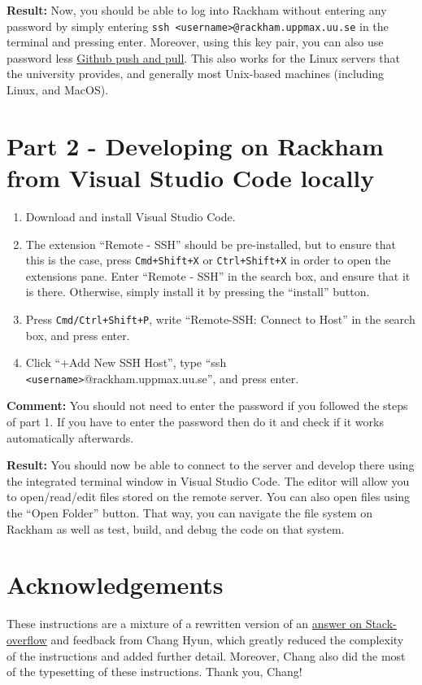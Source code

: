 \documentclass[10pt]{article}
\begin{document}
\textbf{Result:} Now, you should be able to log into Rackham without entering any password by simply entering
\texttt{ssh <username>@rackham.uppmax.uu.se} in the terminal and pressing enter. Moreover, using this key pair,
you can also use password less \href{https://docs.github.com/en/authentication/connecting-to-github-with-ssh/adding-a-new-ssh-key-to-your-github-account}
{Github push and pull}.
This also works for the Linux servers that the university provides, and generally most Unix-based
machines (including Linux, and MacOS).

\section{Part 2 - Developing on Rackham from Visual Studio Code locally}
\begin{enumerate}
\item Download and install Visual Studio Code.
\item The extension “Remote - SSH” should be pre-installed, but to ensure that this is the case, press
\texttt{Cmd+Shift+X} or \texttt{Ctrl+Shift+X} in order to open the extensions pane. Enter “Remote - SSH” in the search box, and
ensure that it is there. Otherwise, simply install it by pressing the “install” button.
\item Press \texttt{Cmd/Ctrl+Shift+P}, write “Remote-SSH: Connect to Host” in the search box, and press enter.
\item Click “+Add New SSH Host”, type “ssh \texttt{<username>}@rackham.uppmax.uu.se”, and press enter.
\end{enumerate}

\textbf{Comment:} You should not need to enter the password if you followed the steps of part 1. If you have
to enter the password then do it and check if it works automatically afterwards.

\textbf{Result:} You should now be able to connect to the server and develop there using the integrated
terminal window in Visual Studio Code. The editor will allow you to open/read/edit files stored on
the remote server. You can also open files using the “Open Folder” button. That
way, you can navigate the file system on Rackham as well as test, build, and debug the code on that
system. 

\section{Acknowledgements}
These instructions are a mixture of a rewritten version of an \href{https://stackoverflow.com/a/69970152/754562}{answer on Stack-overflow} and feedback from Chang Hyun, which greatly reduced the complexity of the instructions and added further detail. Moreover, Chang also did the most of the typesetting of these instructions. Thank you, Chang!
\end{document}
